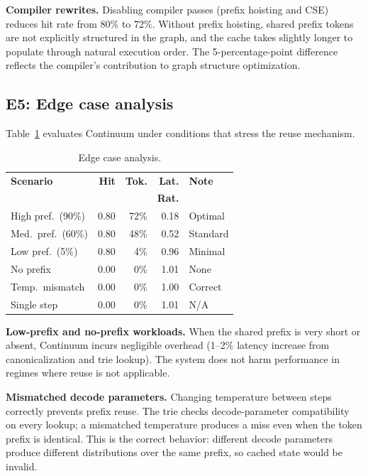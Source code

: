 \documentclass[10pt,twocolumn]{article}
\begin{document}
\textbf{Compiler rewrites.} Disabling compiler passes (prefix hoisting and CSE) reduces hit rate from 80\% to 72\%. Without prefix hoisting, shared prefix tokens are not explicitly structured in the graph, and the cache takes slightly longer to populate through natural execution order. The 5-percentage-point difference reflects the compiler's contribution to graph structure optimization.

\subsection{E5: Edge case analysis}

Table~\ref{tab:edge-cases} evaluates Continuum under conditions that stress the reuse mechanism.

\begin{table}[t]
\centering
{\small
\caption{Edge case analysis.}
\label{tab:edge-cases}
\begin{tabular}{@{}lrrrl@{}}
\toprule
\textbf{Scenario} & \textbf{Hit} & \textbf{Tok.} & \textbf{Lat.} & \textbf{Note} \\
 & & & \textbf{Rat.} & \\
\midrule
High pref.\ (90\%) & 0.80 & 72\% & 0.18 & Optimal \\
Med.\ pref.\ (60\%) & 0.80 & 48\% & 0.52 & Standard \\
Low pref.\ (5\%)    & 0.80 &  4\% & 0.96 & Minimal \\
No prefix          & 0.00 &  0\% & 1.01 & None \\
Temp.\ mismatch    & 0.00 &  0\% & 1.00 & Correct \\
Single step        & 0.00 &  0\% & 1.01 & N/A \\
\bottomrule
\end{tabular}
}
\end{table}

\textbf{Low-prefix and no-prefix workloads.} When the shared prefix is very short or absent, Continuum incurs negligible overhead (1--2\% latency increase from canonicalization and trie lookup). The system does not harm performance in regimes where reuse is not applicable.

\textbf{Mismatched decode parameters.} Changing temperature between steps correctly prevents prefix reuse. The trie checks decode-parameter compatibility on every lookup; a mismatched temperature produces a miss even when the token prefix is identical. This is the correct behavior: different decode parameters produce different distributions over the same prefix, so cached state would be invalid.
\end{document}
